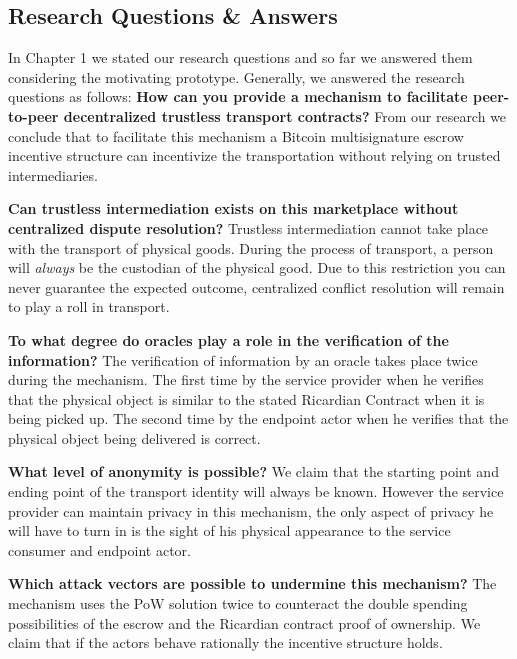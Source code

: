 \subsection{Research Questions \& Answers}

In Chapter 1 we stated our research questions and so far we answered them considering the motivating prototype. Generally, we answered the research questions as follows:
\bigbreak
\noindent \textbf{How can you provide a mechanism to facilitate peer-to-peer decentralized trustless transport contracts?} From our research we conclude that to facilitate this mechanism a Bitcoin multisignature escrow incentive structure can incentivize the transportation without relying on trusted intermediaries.

\bigbreak
\noindent \textbf{Can trustless intermediation exists on this marketplace without centralized dispute resolution?} Trustless intermediation cannot take place with the transport of physical goods. During the process of transport, a person will \textit{always} be the custodian of the physical good. Due to this restriction you can never guarantee the expected outcome, centralized conflict resolution will remain to play a roll in transport.


\bigbreak
\noindent \textbf{To what degree do oracles play a role in the verification of the information?} The verification of information by an oracle takes place twice during the mechanism. The first time by the service provider when he verifies that the physical object is similar to the stated Ricardian Contract when it is being picked up. The second time by the endpoint actor when he verifies that the physical object being delivered is correct.

\bigbreak
\noindent \textbf{What level of anonymity is possible?} We claim that the starting point and ending point of the transport identity will always be known. However the service provider can maintain privacy in this mechanism, the only aspect of privacy he will have to turn in is the sight of his physical appearance to the service consumer and endpoint actor.

\bigbreak
\noindent \textbf{Which attack vectors are possible to undermine this mechanism?} The mechanism uses the PoW solution twice to counteract the double spending possibilities of the escrow and the Ricardian contract proof of ownership. We claim that if the actors behave rationally the incentive structure holds.
\newpage

